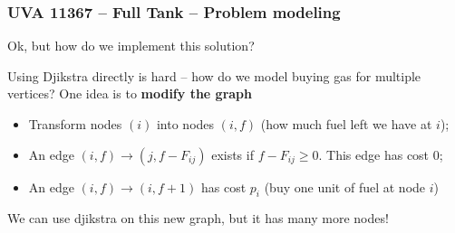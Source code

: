 \documentclass{beamer}
\begin{document}
\begin{frame}
  \frametitle{UVA 11367 -- Full Tank -- Problem modeling}

  {\smaller
    Ok, but how do we implement this solution?
               
    \begin{center}
    \end{center}
    
    \begin{block}{}
      Using Djikstra directly is hard -- how do we model buying gas
      for multiple vertices? One idea is to {\bf modify the graph}
    \end{block}
    
    \bigskip
    \begin{itemize}
    \item Transform nodes $(i)$ into nodes $(i,f)$ (how much fuel left
      we have at $i$);
    \item An edge $(i,f)\rightarrow(j,f-F_{ij})$ exists if $f-F_{ij}
      \geq 0$. This edge has cost 0;
    \item An edge $(i,f)\rightarrow(i,f+1)$ has cost $p_i$ (buy one unit of fuel at node $i$)
    \end{itemize}
    We can use djikstra on this new graph, but it has many more nodes!
  }
\end{frame}
\end{document}
